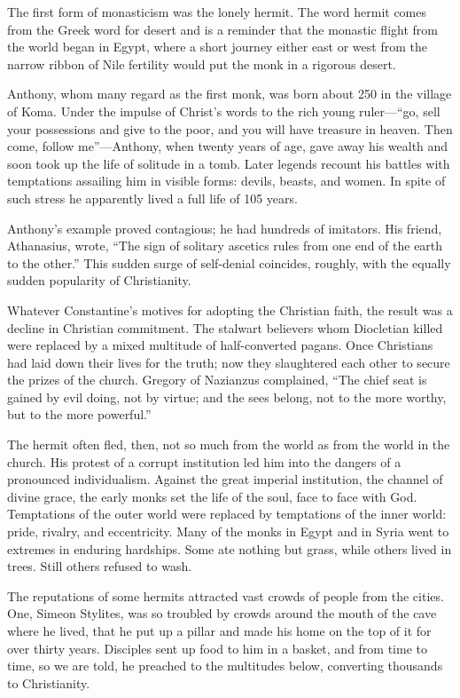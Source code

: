 The first form of monasticism was the lonely hermit. The word hermit comes from the Greek word for
desert and is a reminder that the monastic flight from the world began in Egypt, where a short
journey either east or west from the narrow ribbon of Nile fertility would put the monk in a
rigorous desert.

Anthony, whom many regard as the first monk, was born about 250 in the village of Koma. Under the
impulse of Christ’s words to the rich young ruler—“go, sell your possessions and give to the poor,
and you will have treasure in heaven. Then come, follow me”—Anthony, when twenty years of age, gave
away his wealth and soon took up the life of solitude in a tomb. Later legends recount his battles
with temptations assailing him in visible forms: devils, beasts, and women. In spite of such stress
he apparently lived a full life of 105 years.

Anthony’s example proved contagious; he had hundreds of imitators. His friend, Athanasius, wrote,
“The sign of solitary ascetics rules from one end of the earth to the other.” This sudden surge of
self-denial coincides, roughly, with the equally sudden popularity of Christianity.

Whatever Constantine’s motives for adopting the Christian faith, the result was a decline in
Christian commitment. The stalwart believers whom Diocletian killed were replaced by a mixed
multitude of half-converted pagans. Once Christians had laid down their lives for the truth; now
they slaughtered each other to secure the prizes of the church. Gregory of Nazianzus complained,
“The chief seat is gained by evil doing, not by virtue; and the sees belong, not to the more worthy,
but to the more powerful.”

The hermit often fled, then, not so much from the world as from the world in the church. His protest
of a corrupt institution led him into the dangers of a pronounced individualism. Against the great
imperial institution, the channel of divine grace, the early monks set the life of the soul, face to
face with God. Temptations of the outer world were replaced by temptations of the inner world:
pride, rivalry, and eccentricity. Many of the monks in Egypt and in Syria went to extremes in
enduring hardships. Some ate nothing but grass, while others lived in trees. Still others refused to
wash.

The reputations of some hermits attracted vast crowds of people from the cities. One, Simeon
Stylites, was so troubled by crowds around the mouth of the cave where he lived, that he put up a
pillar and made his home on the top of it for over thirty years. Disciples sent up food to him in a
basket, and from time to time, so we are told, he preached to the multitudes below, converting
thousands to Christianity.

